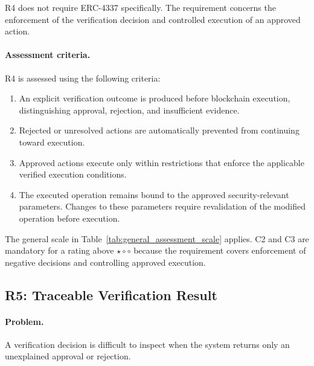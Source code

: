 R4 does not require ERC-4337 specifically. The requirement concerns the
enforcement of the verification decision and controlled execution of an
approved action.

\paragraph{Assessment criteria.}

R4 is assessed using the following criteria:

\begin{enumerate}
    
\item[\textbf{C1}] An explicit verification outcome
is produced before blockchain execution, distinguishing
approval, rejection, and insufficient evidence.

\item[\textbf{C2}] Rejected or unresolved actions are
automatically prevented from continuing toward execution.


    \item[\textbf{C3}] Approved actions execute only within restrictions
that enforce the applicable verified execution conditions.

\item[\textbf{C4}] The executed operation remains bound to the approved
security-relevant parameters. Changes to these parameters require
revalidation of the modified operation before execution.
\end{enumerate}


The general scale in Table~\ref{tab:general_assessment_scale} applies.
C2 and C3 are mandatory for a rating above $\star\circ\circ$ because
the requirement covers enforcement of
negative decisions and controlling approved
execution.


\subsection{R5: Traceable Verification Result}
\label{subsec:r5_traceability}

\paragraph{Problem.}

A verification decision is difficult to inspect when the system returns only an
unexplained approval or rejection.

